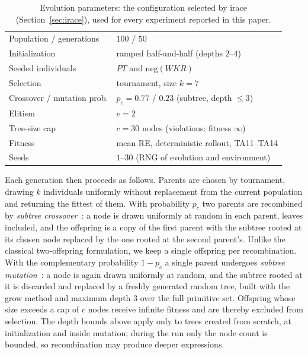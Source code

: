 \documentclass[review,authoryear,11pt]{elsarticle}
\begin{document}
\begin{table}[t]
\centering\small
\caption{Evolution parameters: the configuration selected by irace
(Section~\ref{sec:irace}), used for every experiment reported in this
paper.}
\label{tab:gpparams}
\begin{tabular}{ll}
\toprule
Population / generations & $100$ / $50$ \\
Initialization & ramped half-and-half (depths $2$--$4$) \\
Seeded individuals & $\mathit{PT}$ and $\mathrm{neg}(\mathit{WKR})$ \\
Selection & tournament, size $k = 7$ \\
Crossover / mutation prob. & $p_c = 0.77$ / $0.23$ (subtree, depth $\le 3$) \\
Elitism & $e = 2$ \\
Tree-size cap & $c = 30$ nodes (violations: fitness $\infty$) \\
Fitness & mean RE, deterministic rollout, TA11--TA14 \\
Seeds & $1$--$30$ (RNG of evolution and environment) \\
\bottomrule
\end{tabular}
\end{table}

Each generation then proceeds as follows. Parents are chosen by
tournament, drawing $k$ individuals uniformly without replacement from
the current population and returning the fittest of them. With
probability $p_c$ two parents are recombined by \emph{subtree
crossover}~\citep{Koza1992,Poli2008}: a node is drawn uniformly at
random in each parent, leaves included, and the offspring is a copy of
the first parent with the subtree rooted at its chosen node replaced by
the one rooted at the second parent's. Unlike the classical
two-offspring formulation, we keep a single offspring per
recombination. With the
complementary probability $1-p_c$ a single parent undergoes
\emph{subtree mutation}~\citep{Koza1992,Poli2008}: a node is again drawn
uniformly at random, and the subtree rooted at it is discarded and
replaced by a freshly generated random tree, built with the grow method
and maximum depth $3$ over the full primitive set. Offspring
whose size exceeds a cap of $c$ nodes receive infinite fitness and are
thereby excluded from selection. The depth bounds above apply only to
trees created from scratch, at initialization and inside mutation;
during the run only the node count is bounded, so recombination may
produce deeper expressions.
\end{document}
